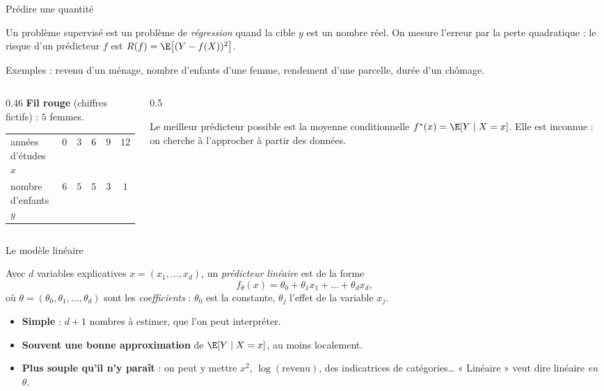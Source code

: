 \documentclass[aspectratio=169,11pt]{beamer}
\begin{document}
\begin{frame}{Prédire une quantité}
  \begin{definition}
    Un problème supervisé est un problème de \emph{régression} quand la cible $y$ est un nombre réel.
    On mesure l'erreur par la perte quadratique : le risque d'un prédicteur $f$ est $R(f)=\E\big[(Y-f(X))^2\big]$.
  \end{definition}
  {\small Exemples : revenu d'un ménage, nombre d'enfants d'une femme, rendement d'une parcelle, durée d'un chômage.}
  \vskip2mm
  \begin{columns}[T]
    \begin{column}{0.46\textwidth}
      \small
      \textbf{Fil rouge} (chiffres fictifs) : $5$ femmes.
      \vskip1mm
      \renewcommand{\arraystretch}{1.15}
      \begin{tabular}{lccccc}
        \toprule
        années d'études $x$ & $0$ & $3$ & $6$ & $9$ & $12$ \\
        nombre d'enfants $y$ & $6$ & $5$ & $5$ & $3$ & $1$ \\
        \bottomrule
      \end{tabular}
    \end{column}
    \begin{column}{0.5\textwidth}
      \begin{remarque}
        Le meilleur prédicteur possible est la moyenne conditionnelle $f^*(x)=\E[Y\mid X=x]$.
        Elle est inconnue : on cherche à l'approcher à partir des données.
      \end{remarque}
    \end{column}
  \end{columns}
\end{frame}

\begin{frame}{Le modèle linéaire}
  \begin{definition}
    Avec $d$ variables explicatives $x=(x_1,\dots,x_d)$, un \emph{prédicteur linéaire} est de la forme
    \[
      f_\theta(x)=\theta_0+\theta_1x_1+\dots+\theta_dx_d ,
    \]
    où $\theta=(\theta_0,\theta_1,\dots,\theta_d)$ sont les \emph{coefficients} : $\theta_0$ est la constante, $\theta_j$ l'effet de la variable $x_j$.
  \end{definition}
  \begin{itemize}\small
    \item \textbf{Simple} : $d+1$ nombres à estimer, que l'on peut interpréter.
    \item \textbf{Souvent une bonne approximation} de $\E[Y\mid X=x]$, au moins localement.
    \item \textbf{Plus souple qu'il n'y paraît} : on peut y mettre $x^2$, $\log(\text{revenu})$, des indicatrices de catégories\dots{} « Linéaire » veut dire linéaire \emph{en $\theta$}.
  \end{itemize}
\end{frame}
\end{document}
